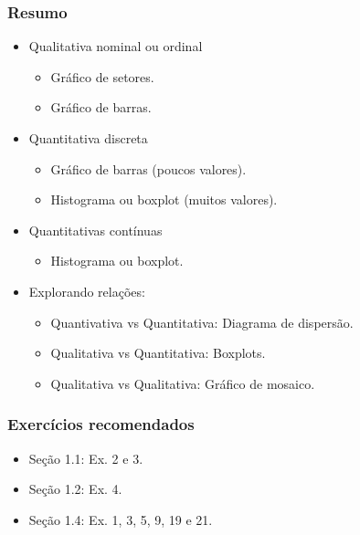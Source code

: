 \documentclass[11pt]{beamer}
\begin{document}
\begin{frame}
\frametitle{Resumo}
\begin{itemize}
\item
  Qualitativa nominal ou ordinal

  \begin{itemize}
  \item
    Gráfico de setores.
  \item
    Gráfico de barras.
  \end{itemize}
\item
  Quantitativa discreta

  \begin{itemize}
  \item
    Gráfico de barras (poucos valores).
  \item
    Histograma ou boxplot (muitos valores).
  \end{itemize}
\item
  Quantitativas contínuas

  \begin{itemize}
  \item
    Histograma ou boxplot.
  \end{itemize}
\item
  Explorando relações:

  \begin{itemize}
  \item
    Quantivativa vs Quantitativa: Diagrama de dispersão.
  \item
    Qualitativa vs Quantitativa: Boxplots.
  \item
    Qualitativa vs Qualitativa: Gráfico de mosaico.
  \end{itemize}
\end{itemize}
\end{frame}

\begin{frame}
\frametitle{Exercícios recomendados}

\begin{itemize}
\item
  Seção 1.1: Ex. 2 e 3.
\item
  Seção 1.2: Ex. 4.
\item
  Seção 1.4: Ex. 1, 3, 5, 9, 19 e 21.
\end{itemize}
\end{frame}
\end{document}
